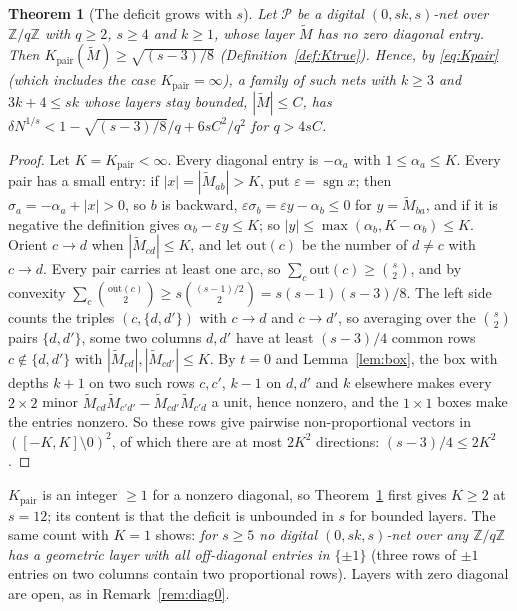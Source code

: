 \documentclass[11pt]{amsart}
\newtheorem{theorem}{Theorem}
\theoremstyle{definition}
\theoremstyle{plain}
\newcommand{\Z}{\mathbb{Z}}
\begin{document}
\begin{theorem}[The deficit grows with $s$]\label{thm:L}
Let $\mathcal P$ be a digital $(0,sk,s)$-net over $\Z/q\Z$ with $q\ge2$, $s\ge4$ and $k\ge1$, whose layer $\tilde M$ has no zero diagonal entry. Then $K_{\mathrm{pair}}(\tilde M)\ge\sqrt{(s-3)/8}$ (Definition~\ref{def:Ktrue}). Hence, by \eqref{eq:Kpair} (which includes the case $K_{\mathrm{pair}}=\infty$), a family of such nets with $k\ge3$ and $3k+4\le sk$ whose layers stay bounded, $|\tilde M|\le C$, has $\delta N^{1/s}<1-\sqrt{(s-3)/8}/q+6sC^2/q^2$ for $q>4sC$.
\end{theorem}

\begin{proof}
Let $K=K_{\mathrm{pair}}<\infty$. Every diagonal entry is $-\alpha_a$ with $1\le\alpha_a\le K$. Every pair has a small entry: if $|x|=|\tilde M_{ab}|>K$, put $\varepsilon=\operatorname{sgn}x$; then $\sigma_a=-\alpha_a+|x|>0$, so $b$ is backward, $\varepsilon\sigma_b=\varepsilon y-\alpha_b\le0$ for $y=\tilde M_{ba}$, and if it is negative the definition gives $\alpha_b-\varepsilon y\le K$; so $|y|\le\max(\alpha_b,K-\alpha_b)\le K$. Orient $c\to d$ when $|\tilde M_{cd}|\le K$, and let $\mathrm{out}(c)$ be the number of $d\ne c$ with $c\to d$. Every pair carries at least one arc, so $\sum_c\mathrm{out}(c)\ge\binom s2$, and by convexity $\sum_c\binom{\mathrm{out}(c)}2\ge s\binom{(s-1)/2}2=s(s-1)(s-3)/8$. The left side counts the triples $(c,\{d,d'\})$ with $c\to d$ and $c\to d'$, so averaging over the $\binom s2$ pairs $\{d,d'\}$, some two columns $d,d'$ have at least $(s-3)/4$ common rows $c\notin\{d,d'\}$ with $|\tilde M_{cd}|,|\tilde M_{cd'}|\le K$. By $t=0$ and Lemma~\ref{lem:box}, the box with depths $k+1$ on two such rows $c,c'$, $k-1$ on $d,d'$ and $k$ elsewhere makes every $2\times2$ minor $\tilde M_{cd}\tilde M_{c'd'}-\tilde M_{cd'}\tilde M_{c'd}$ a unit, hence nonzero, and the $1\times1$ boxes make the entries nonzero. So these rows give pairwise non-proportional vectors in $([-K,K]\setminus0)^2$, of which there are at most $2K^2$ directions: $(s-3)/4\le2K^2$.
\end{proof}

$K_{\mathrm{pair}}$ is an integer $\ge1$ for a nonzero diagonal, so Theorem~\ref{thm:L} first gives $K\ge2$ at $s=12$; its content is that the deficit is unbounded in $s$ for bounded layers. The same count with $K=1$ shows: \emph{for $s\ge5$ no digital $(0,sk,s)$-net over any $\Z/q\Z$ has a geometric layer with all off-diagonal entries in $\{\pm1\}$} (three rows of $\pm1$ entries on two columns contain two proportional rows). Layers with zero diagonal are open, as in Remark~\ref{rem:diag0}.
\end{document}
